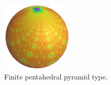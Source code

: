 \begin{figure}[H]
\begin{minipage}{0.5\textwidth}
  \begin{minipage}[t]{0.24\textwidth}
   \centering
   \includegraphics[width=1.35in, height=1.35in, keepaspectratio]{./img/application/sphairahedron/variations/pentahedralPyramid/limitset2.png}
  \end{minipage}
  \hspace*{\fill}
  \caption{Finite pentahedral pyramid type.}
  \label{fig:pentahedralPyramid}
 \end{minipage}
\end{figure}

